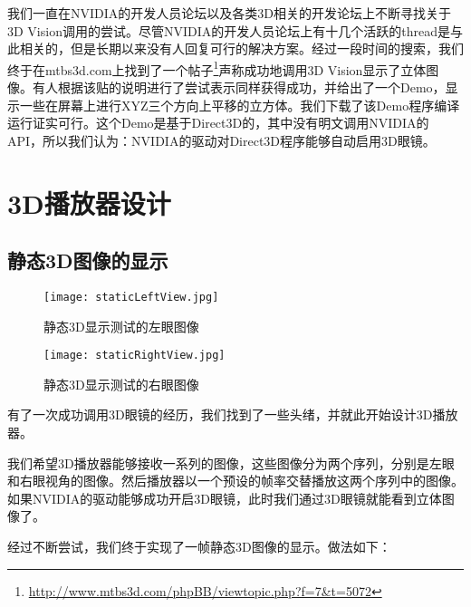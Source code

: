 
我们一直在NVIDIA的开发人员论坛以及各类3D相关的开发论坛上不断寻找关于3D Vision调用的尝试。尽管NVIDIA的开发人员论坛上有十几个活跃的thread是与此相关的，但是长期以来没有人回复可行的解决方案。经过一段时间的搜索，我们终于在mtbs3d.com上找到了一个帖子\footnote{\href{http://www.mtbs3d.com/phpBB/viewtopic.php?f=7&t=5072}{http://www.mtbs3d.com/phpBB/viewtopic.php?f=7\&t=5072}}声称成功地调用3D Vision显示了立体图像。有人根据该贴的说明进行了尝试表示同样获得成功，并给出了一个Demo，显示一些在屏幕上进行XYZ三个方向上平移的立方体。我们下载了该Demo程序编译运行证实可行。这个Demo是基于Direct3D的，其中没有明文调用NVIDIA的API，所以我们认为：NVIDIA的驱动对Direct3D程序能够自动启用3D眼镜。

\section{3D播放器设计}
\label{sec:3dplayerdesign}

\subsection{静态3D图像的显示}
\label{subsec:static3dimgdisp}

\begin{figure}
\begin{minipage}{0.5\textwidth}
	\centering
	\texttt{[image: staticLeftView.jpg]}
	\caption{静态3D显示测试的左眼图像}
	\label{fig:staticleftview}
\end{minipage}\hfill
\begin{minipage}{0.5\textwidth}
	\centering
	\texttt{[image: staticRightView.jpg]}
	\caption{静态3D显示测试的右眼图像}
	\label{fig:staticrightview}
\end{minipage}
\end{figure}

有了一次成功调用3D眼镜的经历，我们找到了一些头绪，并就此开始设计3D播放器。

我们希望3D播放器能够接收一系列的图像，这些图像分为两个序列，分别是左眼和右眼视角的图像。然后播放器以一个预设的帧率交替播放这两个序列中的图像。如果NVIDIA的驱动能够成功开启3D眼镜，此时我们通过3D眼镜就能看到立体图像了。

经过不断尝试，我们终于实现了一帧静态3D图像的显示。做法如下：

